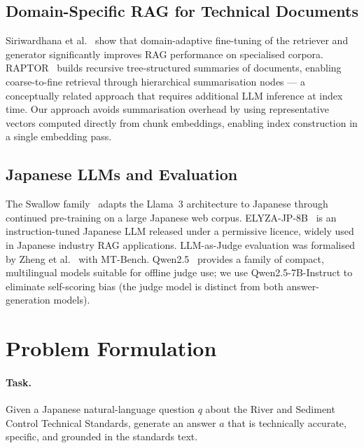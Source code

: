 \documentclass[twocolumn]{article}
\begin{document}
\subsection{Domain-Specific RAG for Technical Documents}

Siriwardhana et al.~\cite{siriwardhana2023domainrag} show that domain-adaptive
fine-tuning of the retriever and generator significantly improves RAG performance
on specialised corpora.
RAPTOR~\cite{sarthi2024raptor} builds recursive tree-structured summaries of
documents, enabling coarse-to-fine retrieval through hierarchical summarisation
nodes --- a conceptually related approach that requires additional LLM inference
at index time.
Our approach avoids summarisation overhead by using representative vectors
computed directly from chunk embeddings, enabling index construction in a
single embedding pass.

\subsection{Japanese LLMs and Evaluation}

The Swallow family~\cite{okazaki2024swallow} adapts the Llama~3 architecture to
Japanese through continued pre-training on a large Japanese web corpus.
ELYZA-JP-8B~\cite{elyza2024} is an instruction-tuned Japanese LLM released under
a permissive licence, widely used in Japanese industry RAG applications.
LLM-as-Judge evaluation was formalised by Zheng et al.~\cite{zheng2023judging}
with MT-Bench.
Qwen2.5~\cite{qwen2025qwen25} provides a family of compact, multilingual models
suitable for offline judge use; we use Qwen2.5-7B-Instruct to eliminate
self-scoring bias (the judge model is distinct from both answer-generation models).

\section{Problem Formulation}
\label{sec:problem}

\paragraph{Task.}
Given a Japanese natural-language question $q$ about the River and Sediment
Control Technical Standards, generate an answer $a$ that is technically accurate,
specific, and grounded in the standards text.
\end{document}

